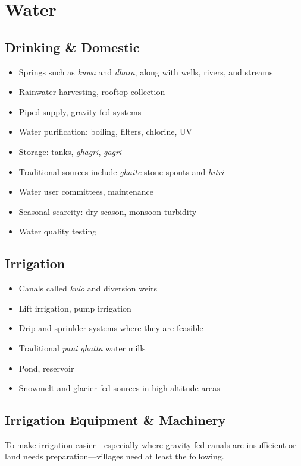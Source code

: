 \documentclass[11pt,a4paper]{article}
\begin{document}
\section{Water}

\subsection{Drinking \& Domestic}
\begin{itemize}
    \item Springs such as \textit{kuwa} and \textit{dhara}, along with wells, rivers, and streams
    \item Rainwater harvesting, rooftop collection
    \item Piped supply, gravity-fed systems
    \item Water purification: boiling, filters, chlorine, UV
    \item Storage: tanks, \textit{ghagri}, \textit{gagri}
    \item Traditional sources include \textit{ghaite} stone spouts and \textit{hitri}
    \item Water user committees, maintenance
    \item Seasonal scarcity: dry season, monsoon turbidity
    \item Water quality testing
\end{itemize}

\subsection{Irrigation}
\begin{itemize}
    \item Canals called \textit{kulo} and diversion weirs
    \item Lift irrigation, pump irrigation
    \item Drip and sprinkler systems where they are feasible
    \item Traditional \textit{pani ghatta} water mills
    \item Pond, reservoir
    \item Snowmelt and glacier-fed sources in high-altitude areas
\end{itemize}

\subsection{Irrigation Equipment \& Machinery}
To make irrigation easier---especially where gravity-fed canals are insufficient or land needs preparation---villages need at least the following.
\end{document}

